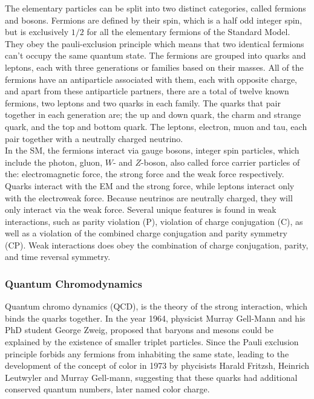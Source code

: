 \documentclass[12pt,a4paper]{article}
\begin{document}
The elementary particles can be split into two distinct categories, called
fermions and bosons. Fermions are defined by their spin, which is a half odd
integer spin, but is exclusively $1/2$ for all the elementary fermions of the
Standard Model. They obey the pauli-exclusion principle which means that two
identical fermions can't occupy the same quantum state. The fermions are grouped
into quarks and leptons, each with three generations or families based on their
masses. All of the fermions have an antiparticle associated with them, each with
opposite charge, and apart from these antiparticle partners, there are a total
of twelve known fermions, two leptons and two quarks in each family. The quarks
that pair together in each generation are; the up and down quark, the charm and
strange quark, and the top and bottom quark. The leptons, electron, muon and
tau, each pair together with a neutrally charged neutrino.\\


In the SM, the fermions interact via gauge bosons, integer spin particles, which
include the photon, gluon, $W$- and $Z$-boson, also called force carrier
particles of the: electromagnetic force, the strong force and the weak force
respectively. Quarks interact with the EM and the strong force, while leptons
interact only with the electroweak force. Because neutrinos are neutrally
charged, they will only interact via the weak force. Several unique features is
found in weak interactions, such as parity violation (P), violation of charge
conjugation (C), as well as a violation of the combined charge conjugation and
parity symmetry (CP). Weak interactions does obey the combination of charge
conjugation, parity, and time reversal symmetry.

\subsubsection{Quantum Chromodynamics}


Quantum chromo dynamics (QCD), is the theory of the strong interaction, which
binds the quarks together. In the year 1964, physicist Murray Gell-Mann and his
PhD student George Zweig, proposed that baryons and mesons could be explained by
the existence of smaller triplet particles\cite{GELLMANN1964214}. Since the
Pauli exclusion principle forbids any fermions from inhabiting the same state,
leading to the development of the concept of color in 1973\cite{FRITZSCH1973365}
by phycisists Harald Fritzsh, Heinrich Leutwyler and Murray Gell-mann,
suggesting that these quarks had additional conserved
quantum numbers, later named color charge.\\
\end{document}
